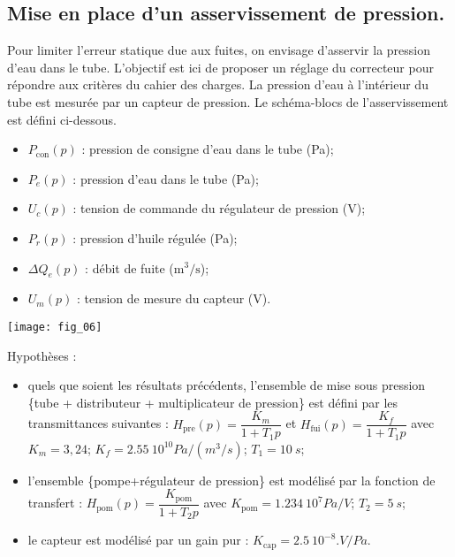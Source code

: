 \subsection*{Mise en place d'un asservissement de pression.}
\ifprof
\else
Pour limiter l’erreur statique due aux fuites, on envisage d’asservir la pression d’eau dans le tube. L’objectif est ici de proposer un réglage du correcteur pour répondre aux critères du cahier des charges.
La pression d’eau à l’intérieur du tube est mesurée par un capteur de pression. Le schéma-blocs de l’asservissement est défini ci-dessous.

\begin{marginfigure}
\begin{itemize}
\item $P_{\text{con}}(p)$ 	: 	pression de consigne d’eau dans le tube (Pa);
\item $P_e(p)$ 	:	pression d’eau dans le tube (Pa);
\item $U_c(p)$ 	: 	tension de commande du régulateur de pression (V);
\item $P_r(p)$ 	:	pression d’huile régulée (Pa);
\item $\Delta Q_e(p)$ 	:	débit de fuite ($\text{m}^3/\text{s}$);
\item $U_m(p)$ 	:	tension de mesure du capteur (V).
\end{itemize}
\end{marginfigure}

\begin{center}
\texttt{[image: fig\_06]}
\end{center}



Hypothèses : 
\begin{itemize}
\item quels que soient les résultats précédents, l’ensemble de mise sous pression \{tube + distributeur + multiplicateur de pression\} est défini par les transmittances suivantes :
$H_{\text{pre}} (p)=\dfrac{K_m}{1+T_1 p}$ et $H_{\text{fui}} (p)=\dfrac{K_f}{1+T_1 p}$
avec $K_m = 3,24$; $K_f = \SI{2,55}{10^{10} Pa/(m^3/s)}$; $T_1  =\SI{10}{s}$; 
\item l’ensemble \{pompe+régulateur de pression\} est modélisé par la fonction de transfert :
$H_{\text{pom}} (p)=\dfrac{K_{\text{pom}}}{1+T_2 p}$ avec $K_{\text{pom}} = \SI{1,234}{10^7 Pa/V}$; 	$T_2 = \SI{5}{s}$;
\item le capteur est modélisé par un gain pur :	$K_{\text{cap}}= \SI{2,5}{10^{-8}.V/Pa}$.
\end{itemize}

